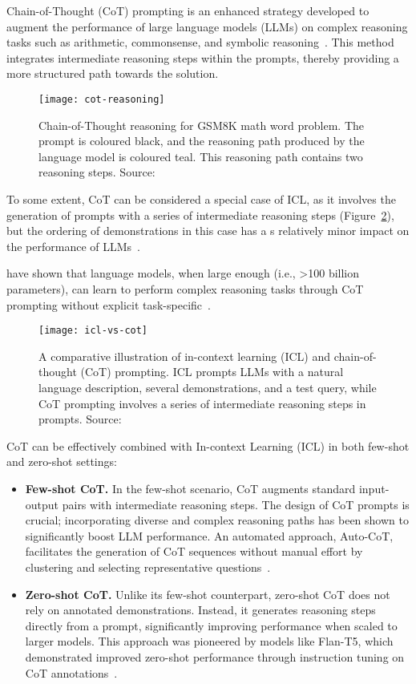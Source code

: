 Chain-of-Thought (CoT) prompting is an enhanced strategy developed to augment the performance of large language models (LLMs) on complex reasoning tasks such as arithmetic, commonsense, and symbolic reasoning~\cite{wei2022chain, miao2021diverse, talmor2019commonsenseqa}.
This method integrates intermediate reasoning steps within the prompts, thereby providing a more structured path towards the solution.
\begin{figure}[h!]
	\centering
	\texttt{[image: cot-reasoning]}
	\caption{Chain-of-Thought reasoning for GSM8K math word problem. The prompt is coloured black, and the reasoning path produced by the language model is coloured teal. This reasoning path contains two reasoning steps. Source: \textcite{li2022making}}
	\label{fig:cot-reasoning}
\end{figure}
To some extent, CoT can be considered a special case of ICL, as it involves the generation of prompts with a series of intermediate reasoning steps (Figure~\ref{fig:chain-of-thought}), but the ordering of demonstrations in this case has a s relatively minor impact on the performance of LLMs~\cite{wei2022chain}.

\textcite{wei2022chain, wang2022self} have shown that language models, when large enough (i.e., \textgreater 100 billion parameters), can learn to perform complex reasoning tasks through CoT prompting without explicit task-specific~\cite{wei2022emergent}.

\begin{figure}[h!]
	\centering
	\texttt{[image: icl-vs-cot]}
	\caption{A comparative illustration of in-context learning (ICL) and chain-of-thought (CoT) prompting. ICL prompts LLMs with a natural language description, several demonstrations, and a test query, while CoT prompting involves a series of intermediate reasoning steps in prompts. Source: \textcite{survey}}
	\label{fig:chain-of-thought}
\end{figure}

CoT can be effectively combined with In-context Learning (ICL) in both few-shot and zero-shot settings:
\begin{itemize}
	\item \textbf{Few-shot CoT.} {In the few-shot scenario, CoT augments standard input-output pairs with intermediate reasoning steps.
		      The design of CoT prompts is crucial; incorporating diverse and complex reasoning paths has been shown to significantly boost LLM performance.
		      An automated approach, Auto-CoT, facilitates the generation of CoT sequences without manual effort by clustering and selecting representative questions~\cite{zhang2022automatic}.
	      }
	\item \textbf{Zero-shot CoT.} {Unlike its few-shot counterpart, zero-shot CoT does not rely on annotated demonstrations.
		      Instead, it generates reasoning steps directly from a prompt, significantly improving performance when scaled to larger models.
		      This approach was pioneered by models like Flan-T5, which demonstrated improved zero-shot performance through instruction tuning on CoT annotations~\cite{chung2022scaling}.
	      }
\end{itemize}

